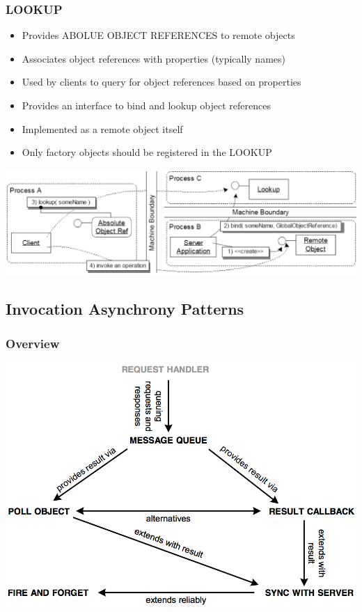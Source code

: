 \documentclass[10pt]{article}
\begin{document}
\subsubsection{LOOKUP}
\begin{itemize}
	\item Provides ABOLUE OBJECT REFERENCES to remote objects
	\item Associates object references with properties (typically names)
	\item Used by clients to query for object references based on properties
	\item Provides an interface to bind and lookup object references
	\item Implemented as a remote object itself
	\item Only factory objects should be registered in the LOOKUP
\end{itemize}
\begin{center}
	\includegraphics[scale=0.2]{images/lookup.png}
\end{center}
\subsection{Invocation Asynchrony Patterns}
\subsubsection{Overview}
\begin{center}
	\includegraphics[scale=0.3]{images/invocation-asynchrony-patterns.png}
\end{center}
\end{document}
